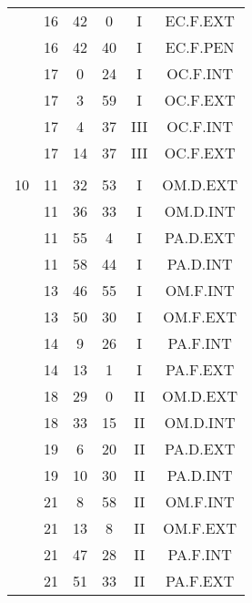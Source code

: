 \documentclass[12pt, a4paper]{article}
\begin{document}
\begin{multicols}{3}
{\begin{tabular}{c c c c c c}
	 	 	 	 & 16 & 42 & 0 & I & EC.F.EXT\\%
	 	 	 	 & 16 & 42 & 40 & I & EC.F.PEN\\%
	 	 	 	 & 17 & 0 & 24 & I & OC.F.INT\\%
	 	 	 	 & 17 & 3 & 59 & I & OC.F.EXT\\%
	 	 	 	 & 17 & 4 & 37 & III & OC.F.INT\\%
	 	 	 	 & 17 & 14 & 37 & III & OC.F.EXT\\%
	 	 	 	 & & & & & \\%
	 	 	 	10 & 11 & 32 & 53 & I & OM.D.EXT\\%
	 	 	 	 & 11 & 36 & 33 & I & OM.D.INT\\%
	 	 	 	 & 11 & 55 & 4 & I & PA.D.EXT\\%
	 	 	 	 & 11 & 58 & 44 & I & PA.D.INT\\%
	 	 	 	 & 13 & 46 & 55 & I & OM.F.INT\\%
	 	 	 	 & 13 & 50 & 30 & I & OM.F.EXT\\%
	 	 	 	 & 14 & 9 & 26 & I & PA.F.INT\\%
	 	 	 	 & 14 & 13 & 1 & I & PA.F.EXT\\%
	 	 	 	 & 18 & 29 & 0 & II & OM.D.EXT\\%
	 	 	 	 & 18 & 33 & 15 & II & OM.D.INT\\%
	 	 	 	 & 19 & 6 & 20 & II & PA.D.EXT\\%
	 	 	 	 & 19 & 10 & 30 & II & PA.D.INT\\%
	 	 	 	 & 21 & 8 & 58 & II & OM.F.INT\\%
	 	 	 	 & 21 & 13 & 8 & II & OM.F.EXT\\%
	 	 	 	 & 21 & 47 & 28 & II & PA.F.INT\\%
	 	 	 	 & 21 & 51 & 33 & II & PA.F.EXT\\%

\end{tabular}}
\end{multicols}
\end{document}
